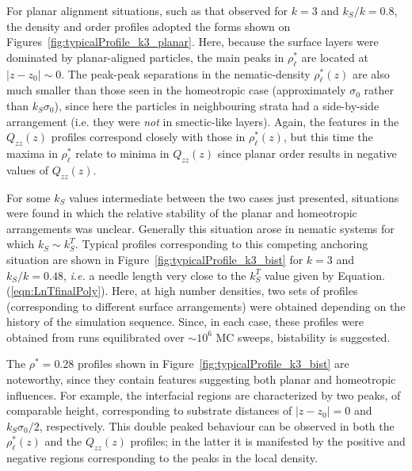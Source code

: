 \documentclass[aps,10pt,twocolumn]{revtex4}
\newcommand{\so}{\sigma_0}
\begin{document}
For planar alignment situations, such as that observed for $k=3$ and $k_S/k = 0.8$, the density and order profiles
adopted the forms shown on Figures~\ref{fig:typicalProfile_k3_planar}. Here, because the surface layers were
dominated by planar-aligned particles, the main peaks in $\rho^{*}_\ell$ are located at $|z-z_0|\sim 0$. The
peak-peak separations in the nematic-density $\rho^{*}_\ell(z)$ are also much smaller than those seen in the
homeotropic case (approximately $\so$ rather than $k_S\so$), since here the particles in neighbouring strata had a
side-by-side arrangement (i.e. they were {\em not} in smectic-like layers). Again, the features in the $Q_{zz}(z)$
profiles correspond closely with those in $\rho^{*}_\ell(z)$, but this time the maxima in $\rho^{*}_\ell$ relate
to minima in $Q_{zz}(z)$ since planar order results in negative values of $Q_{zz}(z)$.

For some $k_S$ values intermediate between the two cases just presented, situations were found in which the
relative stability of the planar and homeotropic arrangements was unclear. Generally this situation arose in
nematic systems for which $k_S \sim k_S^{T}$. Typical profiles corresponding to this competing anchoring situation
are shown in Figure~\ref{fig:typicalProfile_k3_bist} for $k=3$ and $k_S/k=0.48$, {\em i.e.} a needle length very
close to the $k_S^{T}$ value given by Equation.(\ref{eqn:LnTfinalPoly}). Here, at high number densities, two sets of
profiles (corresponding to different surface arrangements) were obtained depending on the history of the
simulation sequence. Since, in each case, these profiles were obtained from runs equilibrated over $\sim 10^6$ MC
sweeps, bistability is suggested.

The $\rho^*=0.28$ profiles shown in Figure~\ref{fig:typicalProfile_k3_bist} are noteworthy, since they contain
features suggesting both planar and homeotropic influences. For example, the interfacial regions are characterized
by two peaks, of comparable height, corresponding to substrate distances of $|z-z_0|=0$ and $k_S \so / 2$,
respectively. This double peaked behaviour can be observed in both the $\rho^{*}_\ell(z)$ and the $Q_{zz}(z)$
profiles; in the latter it is manifested by the positive and negative regions corresponding to the peaks in the
local density.
\end{document}
